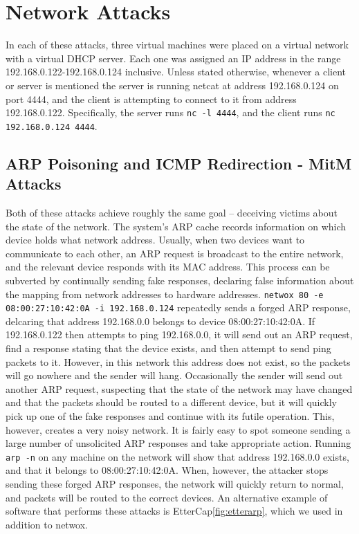 \section{Network Attacks}


In each of these attacks, three virtual machines were placed on a virtual network with a virtual DHCP server. Each one
was assigned an IP address in the range 192.168.0.122-192.168.0.124 inclusive. Unless stated otherwise, whenever a
client or server is mentioned the server is running netcat at address 192.168.0.124 on port 4444, and the client is
attempting to connect to it from address 192.168.0.122. Specifically, the server runs {\tt nc -l 4444}, and the client
runs {\tt nc 192.168.0.124 4444}.

\subsection{ARP Poisoning and ICMP Redirection - MitM Attacks}

Both of these attacks achieve roughly the same goal -- deceiving victims about the state of the network. The system's
ARP cache records information on which device holds what network address. Usually, when two devices want to communicate
to each other, an ARP request is broadcast to the entire network, and the relevant device responds with its MAC address.
This process can be subverted by continually sending fake responses, declaring false information about the mapping from
network addresses to hardware addresses. {\tt netwox 80 -e 08:00:27:10:42:0A -i 192.168.0.124} repeatedly sends a forged
ARP response, delcaring that address 192.168.0.0 belongs to device 08:00:27:10:42:0A. If 192.168.0.122 then attempts to
ping 192.168.0.0, it will send out an ARP request, find a response stating that the device exists, and then attempt to
send ping packets to it. However, in this network this address does not exist, so the packets will go nowhere and the
sender will hang. Occasionally the sender will send out another ARP request, suspecting that the state of the network
may have changed and that the packets should be routed to a different device, but it will quickly pick up one of the
fake responses and continue with its futile operation. This, however, creates a very noisy network. It is fairly easy to
spot someone sending a large number of unsolicited ARP responses and take appropriate action. Running {\tt arp -n} on
any machine on the network will show that address 192.168.0.0 exists, and that it belongs to 08:00:27:10:42:0A. When,
however, the attacker stops sending these forged ARP responses, the network will quickly return to normal, and packets
will be routed to the correct devices. An alternative example of software that performs these attacks is
EtterCap\ref{fig:etterarp}, which we used in addition to netwox.

